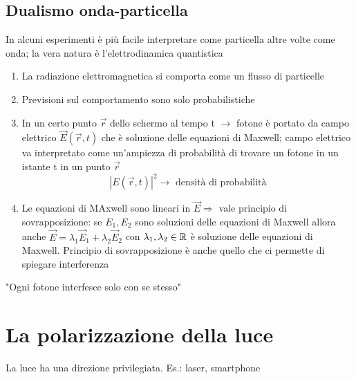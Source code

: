 \subsection*{Dualismo onda-particella}
In alcuni esperimenti è più facile interpretare come particella altre volte come onda; la vera natura è l'elettrodinamica quantistica
\begin{enumerate}
    \item La radiazione elettromagnetica si comporta come un flusso di particelle
    \item Previsioni sul comportamento sono solo probabilistiche
    \item In un certo punto $\vec{r}$ dello schermo al tempo t $\rightarrow$ fotone è portato da campo elettrico $\vec{E}(\vec{r}, t)$ che è soluzione delle equazioni di Maxwell; campo elettrico va interpretato come un'ampiezza di probabilità di trovare un fotone in un istante t in un punto $\vec{r}$
    \begin{equation*}
        {|E(\vec{r},t)|}^2 \rightarrow \text{ densità di probabilità}
    \end{equation*}
    \item Le equazioni di MAxwell sono lineari in $\vec{E} \Rightarrow$ vale principio di sovrapposizione: se $E_1, E_2$ sono soluzioni delle equazioni di Maxwell allora anche $\vec{E} = \lambda_1\vec{E}_1 + \lambda_2 \vec{E}_2$ con $\lambda_1,\lambda_2 \in \mathbb{R}$ è soluzione delle equazioni di Maxwell. Principio di sovrapposizione è anche quello che ci permette di spiegare interferenza
\end{enumerate}
"Ogni fotone interfesce solo con se stesso"

\section{La polarizzazione della luce}
La luce ha una direzione privilegiata. Es.: laser, smartphone \newline

